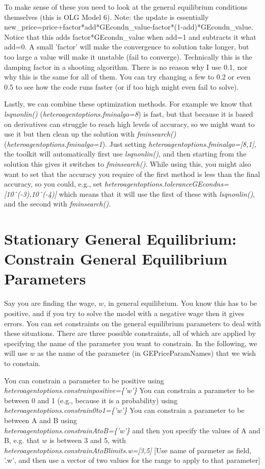 To make sense of these you need to look at the general equilibrium conditions themselves (this is OLG Model 6). Note: the update is essentially new\_price=price+factor*add*GEcondn\_value-factor*(1-add)*GEcondn\_value. Notice that this adds factor*GEcondn\_value when add=1 and subtracts it what add=0. A small 'factor' will make the convergence to solution take longer, but too large a value will make it  unstable (fail to converge). Technically this is the damping factor in a shooting algorithm. There is no reason why I use 0.1, nor why this is the same for all of them. You can try changing a few to 0.2 or even 0.5 to see how the code runs faster (or if too high might even fail to solve).

Lastly, we can combine these optimization methods. For example we know that \textit{lsqnonlin()} (\textit{heteroagentoptions.fminalgo=8}) is fast, but that because it is based on derivatives can struggle to reach high levels of accuracy, so we might want to use it but then clean up the solution with \textit{fminsearch()} (\textit{heteroagentoptions.fminalgo=1}). Just setting \textit{heteroagentoptions.fminalgo=[8,1]}, the toolkit will automatically first use \textit{lsqnonlin()}, and then starting from the solution this gives it switches to \textit{fminsearch()}. While using this, you might also want to set that the accuracy you require of the first method is less than the final accuracy, so you could, e.g., set \textit{heteroagentoptions.toleranceGEcondns=[10ˆ(-3),10ˆ(-4)]} which means that it will use the first of these with \textit{lsqnonlin()}, and the second with \textit{fminsearch()}.

\section{Stationary General Equilibrium: Constrain General Equilibrium Parameters}
Say you are finding the wage, $w$, in general equilibrium. You know this has to be positive, and if you try to solve the model with a negative wage then it gives errors. You can set constraints on the general equilibrium parameters to deal with these situations. There are three possible constraints, all of which are applied by specifying the name of the parameter you want to constrain. In the following, we will use $w$ as the name of the parameter (in GEPriceParamNames) that we wish to constain.

You can constrain a parameter to be positive using
\\ \noindent \textit{heteroagentoptions.constrainpositive=\{'w'\}}
You can constrain a parameter to be between 0 and 1 (e.g., because it is a probability) using
\\ \noindent \textit{heteroagentoptions.constrain0to1=\{'w'\}}
You can constrain a parameter to be between A and B using
\\ \noindent \textit{heteroagentoptions.constrainAtoB=\{'w'\}}
and then you specify the values of A and B, e.g. that $w$ is between 3 and 5, with
\\ \noindent \textit{heteroagentoptions.constrainAtoBlimits.w=[3,5]}
[Use name of parmeter as field, '.w', and then use a vector of two values for the range to apply to that parameter]



